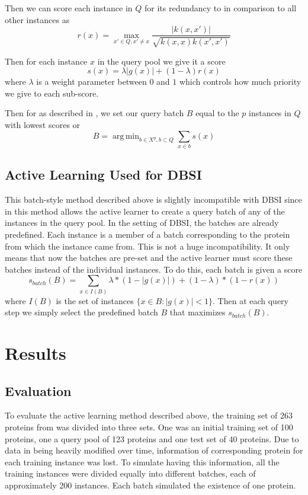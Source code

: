 \documentclass{article}
\DeclareMathOperator*{\argmin}{arg\,min}
\begin{document}
Then we can score each instance in $Q$ for its redundancy to in comparison to all other instances as
\[
r(x) = \max_{x' \in Q, x' \neq x} \frac{|k(x,x')|}{\sqrt{k(x,x)k(x', x')}}
\]

Then for each instance $x$ in the query pool we give it a score
\[
s(x) = \lambda |g(x)| + (1- \lambda) r(x)
\]
where $\lambda$ is a weight parameter between $0$ and $1$ which controls how much priority we give to each sub-score. 

Then for as described in \cite{active_learning}, we set our query batch $B$ equal to the $p$ instances in $Q$ with lowest scores or
\[
B = \argmin_{b \in X^p, b \subset Q} \sum_{x \in b} s(x)
\]

\subsection*{Active Learning Used for DBSI}
This batch-style method described above is slightly incompatible with DBSI since in \cite{active_learning} this method allows the active learner to create a query batch of any of the instances in the query pool. In the setting of DBSI, the batches are already predefined. Each instance is a member of a batch corresponding to the protein from which the instance came from. This is not a huge incompatibility. It only means that now the batches are pre-set and the active learner must score these batches instead of the individual instances. To do this, each batch is given a score
\[
s_{batch}(B) = \sum_{x \in I(B)} \lambda * (1- |g(x)|) + (1-\lambda) * (1 - r(x))
\]
where $I(B)$ is the set of instances $\{x \in B : |g(x)| < 1\}$. Then at each query step we simply select the predefined batch $B$ that maximizes $s_{batch}(B)$.

\section*{Results}
\subsection*{Evaluation}
To evaluate the active learning method described above, the training set of 263 proteins from \cite{dbsi_server} was divided into three sets. One was an initial training set of 100 proteins, one a query pool of 123 proteins and one test set of 40 proteins. Due to data in \cite{dbsi_server} being heavily modified over time, information of corresponding protein for each training instance was lost. To simulate having this information, all the training instances were divided equally into different batches, each of approximately 200 instances. Each batch simulated the existence of one protein. 
\end{document}
